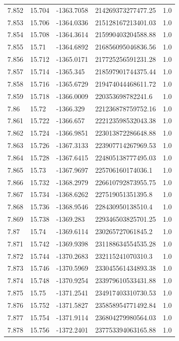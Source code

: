 \begin{tabular}{lllll}
7.852 & 15.704 & -1363.7058 & 214269373277477.25 & 1.0 \\
7.853 & 15.706 & -1364.0336 & 215128167213401.03 & 1.0 \\
7.854 & 15.708 & -1364.3614 & 215990403204588.88 & 1.0 \\
7.855 & 15.71 & -1364.6892 & 216856095046836.56 & 1.0 \\
7.856 & 15.712 & -1365.0171 & 217725256591231.28 & 1.0 \\
7.857 & 15.714 & -1365.345 & 218597901744375.44 & 1.0 \\
7.858 & 15.716 & -1365.6729 & 219474044468611.72 & 1.0 \\
7.859 & 15.718 & -1366.0009 & 220353698782241.6 & 1.0 \\
7.86 & 15.72 & -1366.329 & 221236878759752.16 & 1.0 \\
7.861 & 15.722 & -1366.657 & 222123598532043.38 & 1.0 \\
7.862 & 15.724 & -1366.9851 & 223013872286648.88 & 1.0 \\
7.863 & 15.726 & -1367.3133 & 223907714267969.53 & 1.0 \\
7.864 & 15.728 & -1367.6415 & 224805138777495.03 & 1.0 \\
7.865 & 15.73 & -1367.9697 & 225706160174036.1 & 1.0 \\
7.866 & 15.732 & -1368.2979 & 226610792873955.75 & 1.0 \\
7.867 & 15.734 & -1368.6262 & 227519051351395.8 & 1.0 \\
7.868 & 15.736 & -1368.9546 & 228430950138510.4 & 1.0 \\
7.869 & 15.738 & -1369.283 & 229346503825701.25 & 1.0 \\
7.87 & 15.74 & -1369.6114 & 230265727061845.2 & 1.0 \\
7.871 & 15.742 & -1369.9398 & 231188634554535.28 & 1.0 \\
7.872 & 15.744 & -1370.2683 & 232115241070310.3 & 1.0 \\
7.873 & 15.746 & -1370.5969 & 233045561434893.38 & 1.0 \\
7.874 & 15.748 & -1370.9254 & 233979610533431.88 & 1.0 \\
7.875 & 15.75 & -1371.2541 & 234917403310730.53 & 1.0 \\
7.876 & 15.752 & -1371.5827 & 235858954771492.84 & 1.0 \\
7.877 & 15.754 & -1371.9114 & 236804279980564.03 & 1.0 \\
7.878 & 15.756 & -1372.2401 & 237753394063165.88 & 1.0 \\

\end{tabular}
